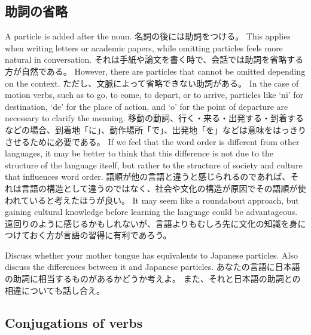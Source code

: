 \documentclass[uplatex,dvipdfmx,b5paper,english,10pt]{jsbook}
\begin{document}
\subsection{助詞の省略}
\fi

\ifEnglish
A particle is added after the noun.
\else
名詞の後には助詞をつける。
\fi
\ifEnglish
This applies when writing letters or academic papers, while omitting particles feels more natural in conversation.
\else
それは手紙や論文を書く時で、会話では助詞を省略する方が自然である。
\fi
\ifEnglish
However, there are particles that cannot be omitted depending on the context.
\else
ただし、文脈によって省略できない助詞がある。
\fi
\ifEnglish
In the case of motion verbs, such as to go, to come, to depart, or to arrive, particles like `ni' for destination, `de' for the place of action, and `o' for the point of departure are necessary to clarify the meaning.
\else
移動の動詞、行く・来る・出発する・到着するなどの場合、到着地「に」、動作場所「で」、出発地「を」などは意味をはっきりさせるために必要である。
\fi
\ifEnglish
If we feel that the word order is different from other languages, it may be better to think that this difference is not due to the structure of the language itself, but rather to the structure of society and culture that influences word order.
\else
語順が他の言語と違うと感じられるのであれば、それは言語の構造として違うのではなく、社会や文化の構造が原因でその語順が使われていると考えたほうが良い。
\fi
\ifEnglish
It may seem like a roundabout approach, but gaining cultural knowledge before learning the language could be advantageous.
\else
遠回りのように感じるかもしれないが、言語よりもむしろ先に文化の知識を身につけておく方が言語の習得に有利であろう。
\fi

\begin{toiquestion}
\ifEnglish
Discuss whether your mother tongue has equivalents to Japanese particles.
Also discuss the differences between it and Japanese particles.
\else
あなたの言語に日本語の助詞に相当するものがあるかどうか考えよ。
また、それと日本語の助詞との相違についても話し合え。
\fi
\end{toiquestion}

\ifEnglish
\subsection{Conjugations of verbs}
\else
\end{document}
